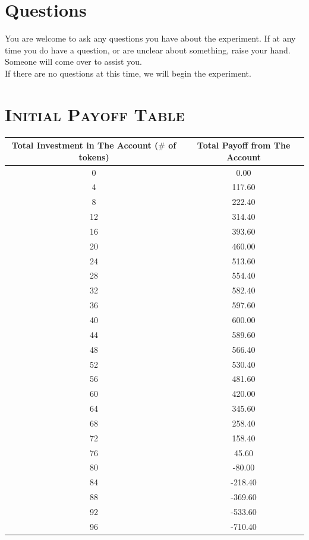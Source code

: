 \documentclass[12pt]{article}
\begin{document}
\section*{Questions}


You are welcome to ask any questions you have about the experiment.  If at any time you do have a question, or are unclear about something, raise your hand. Someone will come over to assist you.\\

If there are no questions at this time, we will begin the experiment.\\


\newpage

\section*{\bf \scshape Initial Payoff Table}

\begin{table}[H]
\centering
\setlength{\tabcolsep}{15pt}
\begin{tabular}{cc}
 {\bf Total Investment in The Account ($\#$ of tokens)} & {\bf Total Payoff from The Account} \\
\toprule
 0 & 0.00 \\[0.5ex]
 4 & 117.60 \\[0.5ex]
 8 & 222.40 \\[0.5ex]
 12 & 314.40 \\[0.5ex]
 16 & 393.60 \\[0.5ex]
 20 & 460.00 \\[0.5ex]
 24 & 513.60 \\[0.5ex]
 28 & 554.40 \\[0.5ex]
 32 & 582.40 \\[0.5ex]
 36 & 597.60 \\[0.5ex]
 40 & 600.00 \\[0.5ex]
 44 & 589.60 \\[0.5ex]
 48 & 566.40 \\[0.5ex]
 52 & 530.40 \\[0.5ex]
 56 & 481.60 \\[0.5ex]
 60 & 420.00 \\[0.5ex]
 64 & 345.60 \\[0.5ex]
 68 & 258.40 \\[0.5ex]
 72 & 158.40 \\[0.5ex]
 76 & 45.60 \\[0.5ex]
 80 & -80.00 \\[0.5ex]
 84 & -218.40 \\[0.5ex]
 88 & -369.60\\[0.5ex]
 92 & -533.60 \\[0.5ex]
 96 & -710.40 \\
\bottomrule
\end{tabular}
\end{table}
\end{document}
